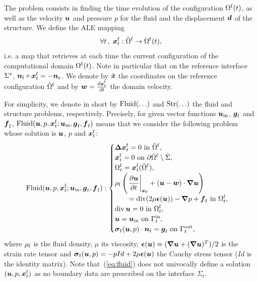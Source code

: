 The problem consists in finding the time evolution of the
configuration $\OmegaFt$, as well as the velocity $\uu u$ and
pressure $p$ for the fluid and the displacement $\D$ of
the structure. We define the ALE mapping
\begin{equation*}
 \forall t \,,\;  \ALE{t} : \hOmegaF \rightarrow \OmegaFt,
\end{equation*}
i.e. a map that retrieves at each time the current configuration
of the computational domain $\OmegaFt$. Note in particular that on
the reference interface $\hWall$, $\uu n_\mf \circ \ALE{t} = -\uu
n_\ms$. We denote by $\bY$ the coordinates on the reference
configuration $\hOmegaF$ and by $\bw=\frac{d \ALE{t}}{dt}$ the
domain velocity.

\medskip
For simplicity, we denote in short by $\NS(\ldots)$ and
$\Str(\ldots)$ the fluid and structure problems, respectively.
Precisely, for given vector functions $\uu u_\In$, $\uu g_\mf$ and
$\uu f_\mf$, $\NS(\U,p,\ALE{t};\uu u_\In, \uu g_\mf, \uu f_\mf)$
means that we consider the following problem whose solution is
$\U$, $p$ and $\ALE{t}$:
\begin{equation}\label{eq:fluid}
  \NS(\U,p,\ALE{t};\uu u_\In, \uu g_\mf, \uu f_\mf):
  \begin{cases}
    \dis  \uu \Delta \ALE{t} = 0 \text{ in } \hOmegaF, \\
    \dis  \ALE{t} = 0 \text{ on } \partial\hOmegaF \setminus\hat\Sigma, \\
    \dis  \OmegaF_{t} = \ALE{t}(\hOmegaF), \\
    \dis  \rho_\mf\left(\diffALE \U + (\U-\bw)\cdot \Grad \U\right) \\
    \dis  \qquad = \Div (2\mu\uu \epsilon(\U)) - \Grad p  + \uu f_\mf \text{ in }\OmegaF_{t}, \\
    \dis  \Div\U=0 \text{ in }\OmegaF_{t},\\
    \dis  \U = \uu u_\In \text{ on } \GamIn_t,\\
    \dis  \uu\sigma_\mf (\uu u,p)\cdot\uu n_\mf = \uu g_\mf \text{ on }\GamOu_{t},
  \end{cases}
\end{equation}
where $\rho_\mf$ is the fluid density, $\mu$ its viscosity,
$\strain(\U) = \Strain u$ is the strain rate tensor and $\uu
\sigma_\mf(\U,p)=-p Id + 2\mu\strain(\U)$ the Cauchy stress
tensor ($ Id $ is the identity matrix). Note
that~(\ref{eq:fluid}) does not univocally define a solution
$(\U,p,\ALE{t})$ as no boundary data are prescribed on the
interface $\Sigma_t$.

